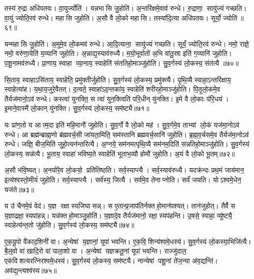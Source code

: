 तस्य॑ रु॒द्रा अधि॑पतयः। वा॒युर्ज्योति॑। यन्नभासि जु॒होति॑। अ॒न्तरि॑क्षमे॒वाव॑ रुन्धे। रु॒द्राणा॒ सायु॑ज्यं गच्छति। वा॒युं ज्योति॒रव॑ रुन्धे। महासि जुहोति। अ॒सौ वै लो॒को महासि। तस्या॑दि॒त्या अधि॑पतयः। सूर्यो॒ ज्योति॑॥६९॥

यन्महासि जु॒होति॑। अ॒मुमे॒व लो॒कमव॑ रुन्धे। आ॒दि॒त्याना॒ सायु॑ज्यं गच्छति। सूर्यं॒ ज्योति॒रव॑ रुन्धे। नमो॒ राज्ञे॒ नमो॒ वरु॑णा॒येति॑ य॒व्यानि॑ जुहोति। अ॒न्नाद्य॒स्याव॑रुध्यै। म॒यो॒भूर्वातो॑ अ॒भि वा॑तू॒स्रा इति॑ ग॒व्यानि॑ जुहोति। प॒शू॒नामव॑रुध्यै। प्रा॒णाय॒ स्वाहा व्या॒नाय॒ स्वाहेति॑ संततिहो॒माञ्जु॑होति। सु॒व॒र्गस्य॑ लो॒कस्य॒ संत॑त्यै ॥७०॥

सि॒ताय॒ स्वाहाऽसि॑ताय॒ स्वाहेति॒ प्रमु॑क्तीर्जुहोति। सु॒व॒र्गस्य॑ लो॒कस्य॒ प्रमु॑क्त्यै। पृ॒थि॒व्यै स्वाहा॒ऽन्तरि॑क्षाय॒ स्वाहेत्या॑ह। य॒था॒य॒जुरे॒वैतत्। द॒त्वते॒ स्वाहा॑ऽद॒न्तका॑य॒ स्वाहेति॑ शरीरहो॒माञ्जु॑होति। पि॒तृ॒लो॒कमे॒व तैर्यज॑मानो॒ऽव॑ रुन्धे। कस्त्वा॑ युनक्ति॒ स त्वा॑ युन॒क्त्विति॑ परि॒धीन् यु॑नक्ति। इ॒मे वै लो॒काः प॑रि॒धय॑। इ॒माने॒वास्मै॑ लो॒कान् यु॑नक्ति। सु॒व॒र्गस्य॑ लो॒कस्य॒ सम॑ष्ट्यै॥७१॥

यः प्रा॑ण॒तो य आत्म॒दा इति॑ महि॒मानौ॑ जुहोति। सु॒व॒र्गो वै लो॒को मह॑। सु॒व॒र्गमे॒व ताभ्यां लो॒कं यज॑मा॒नोऽव॑ रुन्धे। आ ब्रह्म॑न्ब्राह्म॒णो ब्र॑ह्मवर्च॒सी जा॑यता॒मिति॒ सम॑स्तानि ब्रह्मवर्च॒सानि॑ जुहोति। ब्र॒ह्म॒व॒र्चसमे॒व तैर्यज॑मा॒नोऽव॑ रुन्धे। जज्ञि॒ बीज॒मिति॑ जुहो॒त्यन॑न्तरित्यै। अ॒ग्नये॒ सम॑नमत्पृथि॒व्यै सम॑नम॒दिति॑ सन्नतिहो॒माञ्जु॑होति। सु॒व॒र्गस्य॑ लो॒कस्य॒ सन्न॑त्यै। भू॒ताय॒ स्वाहा॑ भविष्य॒ते स्वाहेति॑ भूताभ॒व्यौ होमौ॑ जुहोति। अ॒यं वै लो॒को भू॒तम्॥७२॥

अ॒सौ भ॑वि॒ष्यत्। अ॒नयो॑रे॒व लो॒कयो॒ प्रति॑तिष्ठति। सर्व॒स्याप्त्यै। सर्व॒स्याव॑रुध्यै। यदक्र॑न्दः प्रथ॒मं जाय॑मान॒ इत्य॑श्वस्तो॒मीयं॑ जुहोति। सर्व॒स्याप्त्यै। सर्व॑स्य॒ जित्यै। सर्व॑मे॒व तेनाप्नोति। सर्वं॑ जयति। योऽश्वमे॒धेन॒ यज॑ते॥७३॥

य उ॑ चैनमे॒वं वेद॑। य॒ज्ञ रक्षास्यजिघासन्न्। स ए॒तान्प्र॒जाप॑तिर्नक्तहो॒मान॑पश्यत्। तान॑जुहोत्। तैर्वै स य॒ज्ञाद्रक्षा॒स्यपा॑हन्न्। यन्न॑क्तहो॒माञ्जु॒होति॑। य॒ज्ञादे॒व तैर्यज॑मानो॒ रक्षा॒स्यप॑हन्ति। उ॒षसे॒ स्वाहा॒ व्यु॑ष्ट्यै॒ स्वाहेत्य॑न्त॒तो जु॑होति। सु॒व॒र्गस्य॑ लो॒कस्य॒ सम॑ष्ट्यै॥७४॥\anuvakamend[वै नभासि॒ सूर्यो॒ ज्योति॒ सन्त॑त्यै॒ सम॑ष्ट्यै भू॒तं यज॑ते॒ नव॑ च]

ए॒क॒यू॒पो वै॑काद॒शिनी॑ वा। अ॒न्येषां य॒ज्ञानां॒ यूपा॑ भवन्ति। ए॒क॒वि॒शिन्य॑श्वमे॒धस्य॑। सु॒व॒र्गस्य॑ लो॒कस्या॒भिजि॑त्यै। बै॒ल्॒वो वा॑ खादि॒रो वा॑ पाला॒शो वा। अ॒न्येषां यज्ञक्रतू॒नां यूपा॑ भवन्ति। राज्जु॑दाल॒ एक॑विशत्यरत्निरश्वमे॒धस्य॑। सु॒व॒र्गस्य॑ लो॒कस्य॒ सम॑ष्ट्यै। नान्येषां पशू॒नां ते॑ज॒न्या अ॑व॒द्यन्ति॑। अव॑द्य॒न्त्यश्व॑स्य॥७५॥

